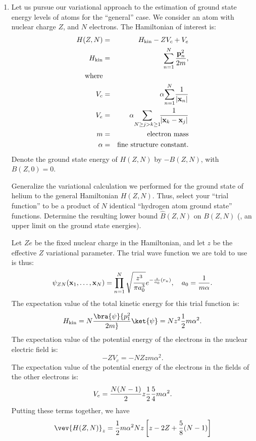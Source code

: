 \begin{enumerate}
\item \label{prob:groundstateE} Let us pursue our variational approach to the estimation of ground
state energy levels of atoms for the ``general'' case.  
We consider an atom with
nuclear charge $Z$, and $N$ electrons.  The Hamiltonian of interest is:
\begin{eqnarray}
H(Z,N)&=&H_{\rm kin}-ZV_{c}+V_{e}\\
H_{\rm kin}&=&\sum\limits^{N}_{n=1}{{\bf p}^{2}_{n}\over 2m},\\
\hbox{where}&&\\
V_{c}&=&\alpha{\sum\limits^{N}_{n=1}}{1\over\vert{\bf x}_{n}\vert}\\
V_{e}&=&\alpha{\sum\limits_{N\geq j>k\geq 1}}\!{1\over\vert{\bf x}_{k}-
{\bf x}_{j}\vert}\\
m&=&\hbox{electron  mass}\\
\alpha &=&\hbox{fine structure constant.}
\end{eqnarray}
Denote the ground state energy of $H(Z,N)$  by $-B(Z,N)$, with
$B(Z,0)=0$.
\noindent 

Generalize the variational calculation we performed for the ground
state of helium to the general Hamiltonian $H(Z,N)$.  Thus, select your ``trial
function'' to be a product of $N$ identical ``hydrogen atom ground state''
functions.  Determine the resulting lower bound $\hat B(Z,N)$ on $B(Z,N)$
(\ie, an upper limit on the ground state energies).

\ifsolve {}
Let $Ze$ be the fixed nuclear charge in the Hamiltonian, and let $z$ be the effective $Z$ variational parameter. The trial wave function we are told to use is thus:
\begin{equation}
 \psi_{ZN}({\bf x}_1,\ldots,{\bf x}_N) = \prod_{n=1}^N\sqrt{{z^3 \over \pi a_0^3}} e^{-{z\over a_0}(r_n)},\quad a_0={1\over m\alpha}.
\end{equation}
The expectation value of the total kinetic energy for this trial function is:
\begin{equation}
 H_{\rm kin} = N\bra{\psi}{p_1^2\over 2m}\ket{\psi} = Nz^2{1\over 2}m\alpha^2.
\end{equation}
The expectation value of the potential energy of the electrons in the nuclear electric field is: 
\begin{equation}
 -ZV_c = -NZzm\alpha^2.
\end{equation}
The expectation value of the potential energy of the electrons in the fields of the other electrons is:
\begin{equation}
 V_e = {N(N-1)\over 2}z{1\over 2}{5\over 4}m\alpha^2.
\end{equation} 
Putting these terms together, we have
\begin{equation}
\vev{H(Z,N)}_z = {1\over 2}m\alpha^2 Nz\left[z-2Z+{5\over 8}(N-1)\right]
\end{equation}


\end{enumerate}
